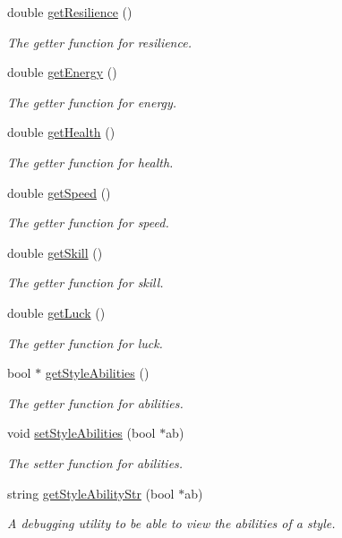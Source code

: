 \begin{DoxyCompactItemize}
double \mbox{\hyperlink{class_style_abd11e168cf29373df6c331c837c098d6}{get\+Resilience}} ()
\begin{DoxyCompactList}\small\item\em The getter function for resilience. \end{DoxyCompactList}\item 
double \mbox{\hyperlink{class_style_a3639ba6dda8813519aa5069ea9510cfd}{get\+Energy}} ()
\begin{DoxyCompactList}\small\item\em The getter function for energy. \end{DoxyCompactList}\item 
double \mbox{\hyperlink{class_style_a104abd9500e122191f11657631066f0e}{get\+Health}} ()
\begin{DoxyCompactList}\small\item\em The getter function for health. \end{DoxyCompactList}\item 
double \mbox{\hyperlink{class_style_a54914751bd96424727451083f7c4a29b}{get\+Speed}} ()
\begin{DoxyCompactList}\small\item\em The getter function for speed. \end{DoxyCompactList}\item 
double \mbox{\hyperlink{class_style_a26b48e7f292efedbca64d0463fcf7685}{get\+Skill}} ()
\begin{DoxyCompactList}\small\item\em The getter function for skill. \end{DoxyCompactList}\item 
double \mbox{\hyperlink{class_style_a5ea623c07dc7358fd94b8a069ab4f8c6}{get\+Luck}} ()
\begin{DoxyCompactList}\small\item\em The getter function for luck. \end{DoxyCompactList}\item 
bool $\ast$ \mbox{\hyperlink{class_style_a6105e3a05ccd4face706a0c66ca863a8}{get\+Style\+Abilities}} ()
\begin{DoxyCompactList}\small\item\em The getter function for abilities. \end{DoxyCompactList}\item 
void \mbox{\hyperlink{class_style_aab96b000dda90385c6e3bc8a3aa07c6a}{set\+Style\+Abilities}} (bool $\ast$ab)
\begin{DoxyCompactList}\small\item\em The setter function for abilities. \end{DoxyCompactList}\item 
string \mbox{\hyperlink{class_style_a00ba8b3874a8204c496cc73e4d60bcbc}{get\+Style\+Ability\+Str}} (bool $\ast$ab)
\begin{DoxyCompactList}\small\item\em A debugging utility to be able to view the abilities of a style. \end{DoxyCompactList}\end{DoxyCompactItemize}



